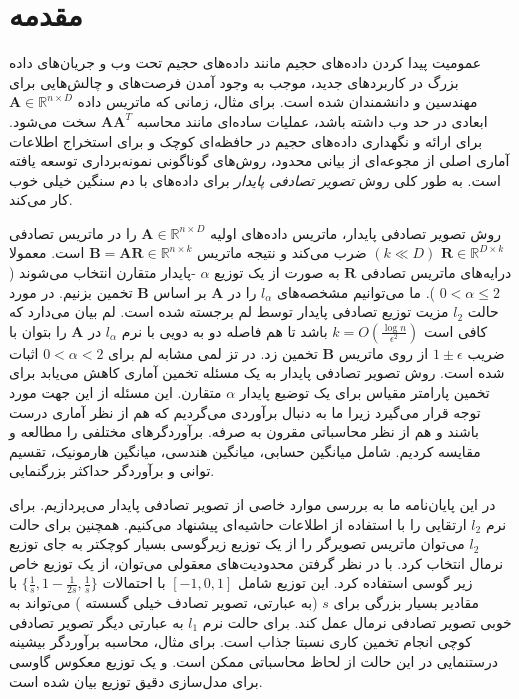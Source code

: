 \chapter{مقدمه}

عمومیت پیدا کردن داده‌های حجیم مانند داده‌های حجیم تحت وب و جریان‌های داده بزرگ در کاربردهای جدید،
موجب به وجود آمدن فرصت‌های و چالش‌هایی برای مهندسین و دانشمندان شده است.
\cite{li2007stable}
برای مثال، زمانی که ماتریس داده 
$\mathbf{A} \in \mathbb{R}^{n \times D}$
ابعادی در حد وب داشته باشد، عملیات ساده‌ای مانند محاسبه
$\mathbf{A} \mathbf{A}^T$
سخت می‌شود.
برای ارائه و نگهداری داده‌های حجیم در حافظه‌ای کوچک و برای استخراج اطلاعات آماری اصلی از مجوعه‌ای از بیانی محدود، روش‌های گوناگونی نمونه‌برداری توسعه‌ یافته است. به طور کلی روش 
\textit{تصویر تصادفی پایدار}%
 برای داده‌های با دم سنگین خیلی خوب کار می‌کند.

روش تصویر تصادفی پایدار، ماتریس داده‌های اولیه 
$\mathbf{A} \in \mathbb{R}^{n \times D}$
را در ماتریس تصادفی 
$\mathbf{R} \in \mathbb{R}^{D \times k}$
$(k \ll D)$
 ضرب می‌کند و نتیجه ماتریس
$\mathbf{B} = \mathbf{AR} \in \mathbb{R}^{n \times k}$
است. 
معمولا درایه‌های ماتریس تصادفی
$\mathbf{R}$
به صورت 
%
از یک توزیع 
$\alpha$
-پایدار متقارن انتخاب می‌شوند (
$ 0 < \alpha \leq 2$
).
ما می‌توانیم مشخصه‌های 
$l_\alpha$
را در 
$\mathbf{A}$
بر اساس 
$\mathbf{B}$
تخمین بزنیم. در مورد حالت 
$l_2$
مزیت توزیع تصادفی پایدار توسط لم 
%
برجسته شده است. لم 
بیان می‌دارد که کافی است 
$k=O(\frac{ \log  n}{\epsilon^ 2})$
باشد تا هم فاصله دو به دویی با نرم 
$l_\alpha$
در 
$\mathbf{A}$
را بتوان با ضریب 
$1 \pm \epsilon$
از روی ماتریس 
$\mathbf{B}$
تخمین زد. در تز 
\cite{li2007stable}
لمی مشابه لم 
برای 
$0 < \alpha < 2$
اثبات شده است. روش تصویر تصادفی پایدار به یک مسئله تخمین آماری کاهش می‌یابد برای تخمین پارامتر مقیاس برای یک توضیع پایدار $\alpha$ متقارن. این مسئله از این جهت مورد توجه قرار می‌گیرد زیرا ما به دنبال برآوردی می‌گردیم که هم از نظر آماری درست باشند و هم از نظر محاسباتی مقرون به صرفه. برآوردگرهای مختلفی را مطالعه و مقایسه کردیم. شامل میانگین حسابی، میانگین هندسی، میانگین هارمونیک، تقسیم توانی%
و برآوردگر حداکثر بزرگنمایی.

در این پایان‌نامه ما به بررسی موارد خاصی از تصویر تصادفی پایدار می‌پردازیم. برای نرم 
$l_2$
ارتقایی را با استفاده از اطلاعات حاشیه‌ای پیشنهاد می‌کنیم. همچنین برای حالت $l_2$ می‌توان ماتریس تصویرگر را از یک توزیع زیرگوسی%
بسیار کوچکتر به جای توزیع نرمال انتخاب کرد. با در نظر گرفتن محدودیت‌های معقولی می‌توان، از یک توزیع خاص زیر گوسی استفاده کرد. این توزیع شامل 
$[-1,0,1]$
با احتمالات 
$\{ \frac{1}{s}, 1-\frac{1}{2s}, \frac{1}{s} \}$
با مقادیر بسیار بزرگی برای 
‌‌‌$s$
(به عبارتی، تصویر تصادف خیلی گسسته %
) می‌تواند به خوبی تصویر تصادفی نرمال عمل کند. برای حالت نرم 
$l_1$
به عبارتی دیگر تصویر تصادفی کوچی %
انجام تخمین کاری نسبتا جذاب است. برای مثال، محاسبه برآوردگر بیشینه درستنمایی 
در این حالت از لحاظ محاسباتی ممکن است. و یک توزیع معکوس گاوسی %
برای مدل‌سازی دقیق توزیع 
بیان شده است.

